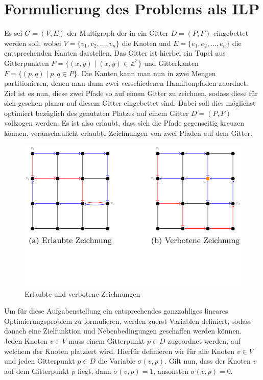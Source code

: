 \documentclass[bachelor, german]{algothesis}
\begin{document}
\section{Formulierung des Problems als ILP}
Es sei $G = (V,E)$ der Multigraph der in ein Gitter $D=(P,F)$ eingebettet werden soll, wobei $V=\{v_1,v_2,\dots, v_n\} $ die Knoten und $E=\{e_1, e_2, \dots, e_n\}$ die entsprechenden Kanten darstellen. Das Gitter ist hierbei ein Tupel aus Gitterpunkten $P=\{(x,y) \mid (x,y) \in \mathbb{Z^2} \}$ und Gitterkanten $F=\{(p,q) \mid p,q \in P\}$. Die Kanten kann man nun in zwei Mengen partitionieren, denen man dann zwei verschiedenen Hamiltonpfaden zuordnet. Ziel ist es nun, diese zwei Pfade so auf einem Gitter zu zeichnen, sodass diese für sich gesehen planar auf diesem Gitter eingebettet sind. Dabei soll dies möglichst optimiert bezüglich des genutzten Platzes auf einem Gitter $D=(P,F)$ vollzogen werden. Es ist also erlaubt, dass sich die Pfade gegenseitig kreuzen können.  veranschaulicht erlaubte Zeichnungen von zwei Pfaden auf dem Gitter. \newline
\begin{figure}[H]
    \centering
    \includegraphics{figures/Erlaubt.png}
    \caption{Erlaubte und verbotene Zeichnungen}
    \label{fig:Grid_Example}
\end{figure}
Um für diese Aufgabenstellung ein entsprechendes ganzzahliges lineares Optimierungsproblem zu formulieren, werden zuerst Variablen definiert, sodass danach eine Zielfunktion und Nebenbedingungen geschaffen werden können. \newline
Jeden Knoten $v \in V$ muss einem Gitterpunkt $p \in D$ zugeordnet werden, auf welchem der Knoten platziert wird. Hierfür definieren wir für alle Knoten $v \in V$ und jeden Gitterpunkt $p \in D$ die Variable $\sigma(v,p)$. Gilt nun, dass der Knoten $v$ auf dem Gitterpunkt $p$ liegt, dann $\sigma(v,p) = 1$, ansonsten $\sigma(v,p) = 0$.  \newline
\end{document}
